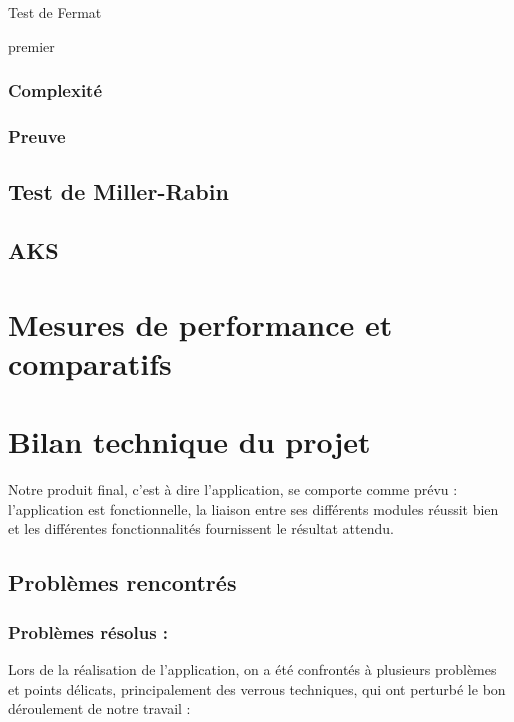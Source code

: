 				\begin{algorithm}
					\caption{Test de Fermat\label{TF}}
				\Retour premier\;
				\end{algorithm}
		
			\subsubsection{Complexité}
			\subsubsection{Preuve}
		
		\subsection{Test de Miller-Rabin}
		
		\subsection{AKS}
		
	\section{Mesures de performance et comparatifs}
	
		
	\section{Bilan technique du projet}
		Notre produit final, c'est à dire l'application, se comporte comme prévu : l'application est fonctionnelle, la liaison entre ses différents modules réussit bien et les différentes fonctionnalités fournissent le résultat attendu.		

		\subsection{Problèmes rencontrés}
			\subsubsection*{Problèmes résolus :} 
			Lors de la réalisation de l'application, on a été confrontés à plusieurs problèmes et points délicats, principalement des verrous techniques, qui ont perturbé le bon déroulement de notre travail :
				
